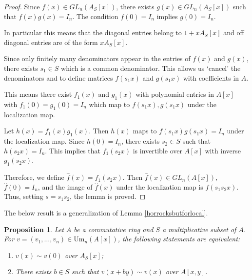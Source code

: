 \documentclass[12pt]{report}
\numberwithin{equation}{section}
\newcounter{dummy} \numberwithin{dummy}{section}
\newtheorem{proposition}[dummy]{Proposition}
\begin{document}
		\begin{proof}
			Since $f(x) \in GL_n(A_S[x])$, there exists $g(x) \in GL_n(A_S[x])$ such that $f(x)g(x) = I_n$. The condition $f(0) = I_n$ implies $g(0) = I_n$.
			
			In particular this means that the diagonal entries belong to $1 + xA_S[x]$ and off diagonal entries are of the form $x A_S[x]$.
			
			Since only finitely many denominators appear in the entries of $f(x)$ and $g(x)$, there exists $s_1 \in S$ which is a common denominator.  This allows us `cancel' the denominators and to define matrices $f(s_1 x)$ and $g(s_1 x)$ with coefficients in $A$. 
			
			This means there exist $f_1(x)$ and $g_1(x)$ with polynomial entries in $A[x]$ with $f_1(0) = g_1(0) = I_n$ which map to $f(s_1x), g(s_1x)$ under the localization map.
			
			Let $h(x) = f_1(x)g_1(x)$. Then $h(x)$ maps to $f(s_1x)g(s_1x) = I_n$ under the localization map. Since $h(0) = I_n$, there exists $s_2 \in S$ such that $h(s_2x) = I_n$.  This implies that $f_1(s_2x)$ is invertible over $A[x]$ with inverse $g_1(s_2x)$.
			
			Therefore, we define $\hat{f}(x) = f_1(s_2x)$.  Then $\hat{f}(x) \in GL_n(A[x])$, $\hat{f}(0) = I_n$, and the image of $\hat{f}(x)$ under the localization map is $f(s_1 s_2 x)$. Thus, setting $s = s_1 s_2$, the lemma is proved.
			\end{proof}
		
			The below result is a generalization of Lemma \ref{horrocksbutforlocal}.
	\begin{proposition}\label{generaliationoflocalhorrocks}
		Let $A$ be a commutative ring and $S$ a multiplicative subset of $A$. For $v = (v_1, \dots, v_n) \in \mathrm{Um}_n(A[x])$, the following statements are equivalent:
		\begin{enumerate}
			\item $v(x) \sim v(0)$ over $A_S[x]$;
			\item There exists $b \in S$ such that $v(x + by) \sim v(x)$ over $A[x, y]$.
		\end{enumerate}
	\end{proposition}
	
\end{document}
